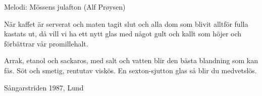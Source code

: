\begin{song}

\begin{songmeta}
Melodi: Mössens julafton (Alf Prøysen)
\end{songmeta}

\begin{songtext}
När kaffet är serverat och maten tagit slut
och alla dom som blivit alltför fulla kastats ut,
då vill vi ha ett nytt glas med något gult och kallt
som höjer och förbättrar vår promillehalt.

Arrak, etanol och sackaros,
med salt och vatten blir den bästa blandning som kan fås.
Söt och smetig, rentutav viskös.
En sexton-sjutton glas så blir du medvetslös.
\end{songtext}

\begin{songnotes}
Sångarstriden 1987, Lund
\end{songnotes}

\end{song}

